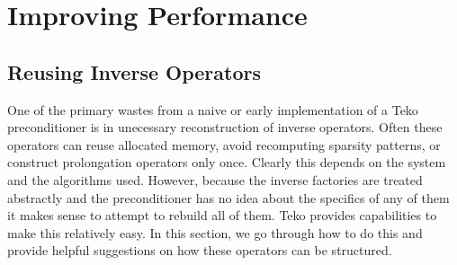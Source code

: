 \documentclass[12pt]{article}
\begin{document}
\section{Improving Performance}

\subsection{Reusing Inverse Operators}
One of the primary wastes from a naive or early implementation of a Teko preconditioner
is in unecessary reconstruction of inverse operators. Often these operators can reuse
allocated memory, avoid recomputing sparsity patterns, or construct prolongation operators
only once. Clearly this depends on the system and the algorithms used.  However, because
the inverse factories are treated abstractly and the preconditioner has no idea about the
specifics of any of them it makes sense to attempt to rebuild all of them. Teko provides
capabilities to make this relatively easy. In this section, we go through how to do this
and provide helpful suggestions on how these operators can be structured.
\end{document}
